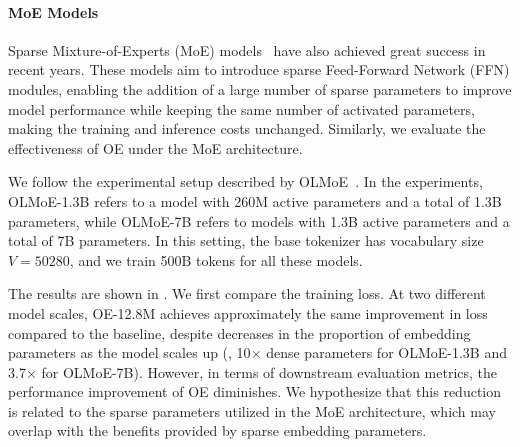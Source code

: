 \begin{table}
\centering
\caption{Performance of Over-Encoding on MoE architecture with 500B tokens' training. The column `Emb. P.' represents `Embedding Parameters'. `Downstream' stands for the average of MMLU-Var, Hellaswag, ARC-Challenge, ARC-Easy, and PIQA. For `+OE' rows, we provide metric difference with blue labels.}
\label{tab:olmoe_sota_oe}
\end{table}

\paragraph{MoE Models}
Sparse Mixture-of-Experts (MoE) models~\cite{shazeer2017} have also achieved great success in recent years. These models aim to introduce sparse Feed-Forward Network (FFN) modules, enabling the addition of a large number of sparse parameters to improve model performance while keeping the same number of activated parameters, making the training and inference costs unchanged. Similarly, we evaluate the effectiveness of OE under the MoE architecture.

We follow the experimental setup described by OLMoE~\cite{muennighoff2024olmoeopenmixtureofexpertslanguage}. In the experiments, OLMoE-1.3B refers to a model with 260M active parameters and a total of 1.3B parameters, while OLMoE-7B refers to models with 1.3B active parameters and a total of 7B parameters. In this setting, the base tokenizer has vocabulary size $V=50280$, and we train 500B tokens for all these models.

The results are shown in . We first compare the training loss. At two different model scales, OE-12.8M achieves approximately the same improvement in loss compared to the baseline, despite decreases in the proportion of embedding parameters as the model scales up (\ie, 10$\times$ dense parameters for OLMoE-1.3B and 3.7$\times$ for OLMoE-7B). However, in terms of downstream evaluation metrics, the performance improvement of OE diminishes. We hypothesize that this reduction is related to the sparse parameters utilized in the MoE architecture, which may overlap with the benefits provided by sparse embedding parameters.

